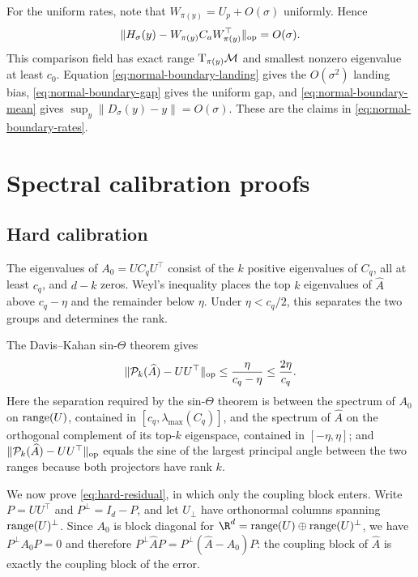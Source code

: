 For the uniform rates, note that
$W_{\pi(y)}=U_p+O(\sigma)$ uniformly.  Hence
\begin{equation}
  \|H_\sigma(y)-W_{\pi(y)}C_aW_{\pi(y)}^\top\|_{\mathrm{op}}
  =O(\sigma).
\end{equation}
This comparison field has exact range $\mathrm{T}_{\pi(y)}\mathcal{M}$ and smallest
nonzero eigenvalue at least $c_0$.  Equation
\eqref{eq:normal-boundary-landing} gives the $O(\sigma^2)$ landing
bias, \eqref{eq:normal-boundary-gap} gives the uniform gap, and
\eqref{eq:normal-boundary-mean} gives
$\sup_y\|D_\sigma(y)-y\|=O(\sigma)$.  These are the claims in
\eqref{eq:normal-boundary-rates}.

\section{Spectral calibration proofs}
\label{app:spectral}

\subsection{Hard calibration}

The eigenvalues of $A_0=UC_qU^\top$ consist of the $k$ positive eigenvalues of $C_q$, all at least $c_q$, and $d-k$ zeros.  Weyl's inequality places the top $k$ eigenvalues of $\widehat A$ above $c_q-\eta$ and the remainder below $\eta$.  Under $\eta<c_q/2$, this separates the two groups and determines the rank.

The Davis--Kahan sin-$\Theta$ theorem \citep{daviskahan1970rotation} gives
\[
  \|\mathcal P_k(\widehat A)-UU^\top\|_{\mathrm{op}}
  \le\frac{\eta}{c_q-\eta}
  \le\frac{2\eta}{c_q}.
\]
Here the separation required by the sin-$\Theta$ theorem is between the spectrum
of $A_0$ on $\operatorname{range}(U)$, contained in $[c_q,\lambda_{\max}(C_q)]$, and the
spectrum of $\widehat A$ on the orthogonal complement of its top-$k$ eigenspace,
contained in $[-\eta,\eta]$; and $\|\mathcal P_k(\widehat A)-UU^\top\|_{\mathrm{op}}$
equals the sine of the largest principal angle between the two ranges because
both projectors have rank $k$.

We now prove \eqref{eq:hard-residual}, in which only the coupling block enters.
Write $P=UU^\top$ and $P^\perp=I_d-P$, and let $U_\perp$ have orthonormal columns
spanning $\operatorname{range}(U)^\perp$.  Since $A_0$ is block diagonal for
$\R^d=\range(U)\oplus\range(U)^\perp$, we have $P^\perp A_0P=0$ and therefore
$P^\perp\widehat AP=P^\perp(\widehat A-A_0)P$: the coupling block of
$\widehat A$ is exactly the coupling block of the error.

